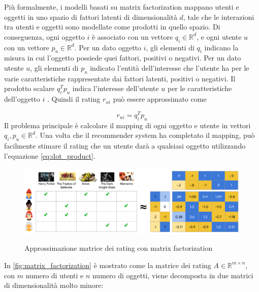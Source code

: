 Più formalmente, i modelli basati su matrix factorization mappano utenti e oggetti in uno spazio di fattori latenti di dimensionalità $d$, tale che le interazioni tra utenti e oggetti sono modellate come prodotti in quello spazio. Di conseguenza, ogni oggetto $i$ è associato con un vettore $q_i \in \mathbb{R}^d$, e ogni utente $u$ con un vettore $p_u \in \mathbb{R}^d$. Per un dato oggetto $i$, gli elementi di $q_i$ indicano la misura in cui l'oggetto possiede quei fattori, positivi o negativi. Per un dato utente $u$, gli elementi di $p_u$ indicato l'entità dell'interesse che l'utente ha per le varie caratteristiche rappresentate dai fattori latenti, positivi o negativi. Il prodotto scalare $q_i^Tp_u$ indica l'interesse dell'utente $u$ per le caratteristiche dell'oggetto $i$ \cite{matrix-factorization}. Quindi il rating $r_{ui}$ può essere approssimato come

\begin{equation} \label{eq:dot_product}
r_{ui} = q_i^Tp_u
\end{equation}
Il problema principale è calcolare il mapping di ogni oggetto e utente in vettori $q_i, p_u \in \mathbb{R}^d$. Una volta che il recommender system ha completato il mapping, può facilmente stimare il rating che un utente darà a qualsiasi oggetto utilizzando l'equazione \ref{eq:dot_product}. 

\begin{figure}
  \centering
  \includegraphics[width=\linewidth]{immagini/matrix_factorization.pdf}
  \caption{Approssimazione matrice dei rating con matrix factorization}
  \cite{mf-google}
  \label{fig:matrix_factorization}
\end{figure}

In \autoref{fig:matrix_factorization} è mostrato come la matrice dei rating $A \in \mathbb{R}^{m \times n}$, con $m$ numero di utenti e $n$ numero di oggetti, viene decomposta in due matrici di dimensionalità molto minore:

